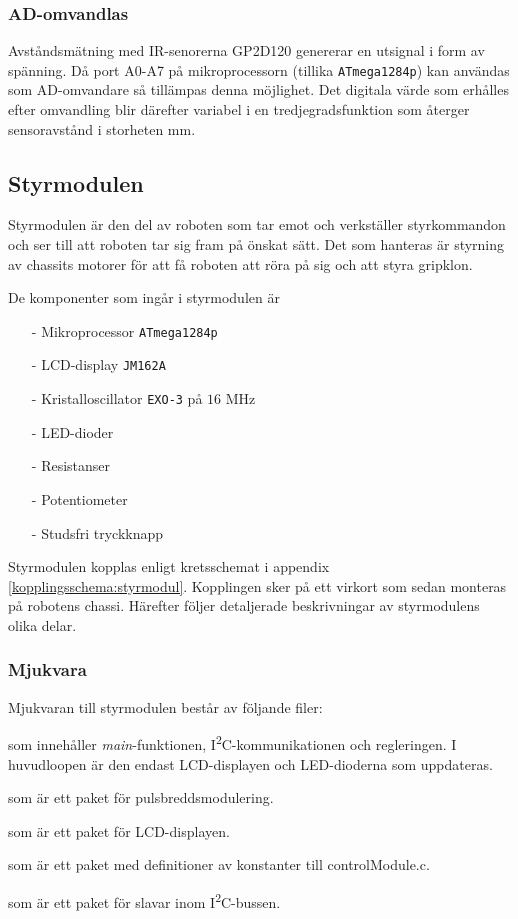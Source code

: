 \documentclass[11pt]{article}
\begin{document}
\begin{flushleft}
\subsubsection{AD-omvandlas}
Avståndsmätning med IR-senorerna GP2D120 genererar en utsignal i form av spänning. Då port A0-A7 på mikroprocessorn (tillika \verb+ATmega1284p+) kan användas som AD-omvandare så tillämpas denna möjlighet. Det digitala värde som erhålles efter omvandling blir därefter variabel i en tredjegradsfunktion som återger sensoravstånd i storheten mm.


\subsection{Styrmodulen}

Styrmodulen är den del av roboten som tar emot och verkställer styrkommandon och ser till att roboten tar sig fram på önskat sätt. Det som hanteras är styrning av chassits motorer för att få roboten att röra på sig och att styra gripklon. 

De komponenter som ingår i styrmodulen är
\begin{itemize}
  \item[-] Mikroprocessor \verb+ATmega1284p+
  \item[-] LCD-display \verb+JM162A+
  \item[-] Kristalloscillator \verb+EXO-3+ på $16$ MHz
  \item[-] LED-dioder
  \item[-] Resistanser
  \item[-] Potentiometer
  \item[-] Studsfri tryckknapp
\end{itemize}

Styrmodulen kopplas enligt kretsschemat i appendix \ref{kopplingsschema:styrmodul}. Kopplingen sker på ett virkort som sedan monteras på robotens chassi. Härefter följer detaljerade beskrivningar av styrmodulens olika delar.

\subsubsection{Mjukvara}
Mjukvaran till styrmodulen består av följande filer:
\begin{description}[style=unboxed, leftmargin=0cm]
  \item[controlModule.c] som innehåller \textit{main}-funktionen, I\textsuperscript{2}C-kommunikationen och regleringen. I huvudloopen är den endast LCD-displayen och LED-dioderna som uppdateras.
  \item[PWM.h] som är ett paket för pulsbreddsmodulering.
  \item[LCD.h] som är ett paket för LCD-displayen.
  \item[constants.h] som är ett paket med definitioner av konstanter till controlModule.c.
  \item[I2C\_slave.h] som är ett paket för slavar inom I\textsuperscript{2}C-bussen.


\end{description}
\end{flushleft}
\end{document}
